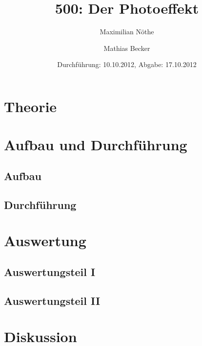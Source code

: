 \documentclass[titlepage=firstiscover]{scrartcl}
\title{500: Der Photoeffekt}
\author{Maximilian Nöthe \and Mathias Becker}
\date{Durchführung: 10.10.2012, Abgabe: 17.10.2012}
\begin{document}
\maketitle
\tableofcontents
\newpage

\section{Theorie}

\section{Aufbau und Durchführung}

\subsection{Aufbau}
\subsection{Durchführung}

\section{Auswertung}
\subsection{Auswertungsteil I}
\subsection{Auswertungsteil II}

\section{Diskussion}
\end{document}
